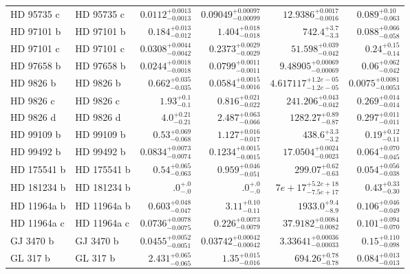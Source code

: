 \begin{longtable*}{llrrrr}
HD 95735 c & HD 95735 c & $0.0112^{+0.0013}_{-0.0013}$ & $0.09049^{+0.00097}_{-0.00099}$ & $12.9386^{+0.0017}_{-0.0016}$ & $0.089^{+0.10}_{-0.063}$ \\ 
HD 97101 b & HD 97101 b & $0.184^{+0.013}_{-0.012}$ & $1.404^{+0.018}_{-0.018}$ & $742.4^{+3.7}_{-3.3}$ & $0.088^{+0.066}_{-0.058}$ \\ 
HD 97101 c & HD 97101 c & $0.0308^{+0.0044}_{-0.0042}$ & $0.2373^{+0.0029}_{-0.0029}$ & $51.598^{+0.039}_{-0.042}$ & $0.24^{+0.15}_{-0.14}$ \\ 
HD 97658 b & HD 97658 b & $0.0244^{+0.0018}_{-0.0018}$ & $0.0799^{+0.0011}_{-0.0011}$ & $9.48905^{+0.00069}_{-0.00069}$ & $0.06^{+0.062}_{-0.042}$ \\ 
HD 9826 b & HD 9826 b & $0.662^{+0.035}_{-0.035}$ & $0.0584^{+0.0015}_{-0.0016}$ & $4.617117^{+1.2e-05}_{-1.2e-05}$ & $0.0075^{+0.0081}_{-0.0053}$ \\ 
HD 9826 c & HD 9826 c & $1.93^{+0.1}_{-0.1}$ & $0.816^{+0.021}_{-0.022}$ & $241.206^{+0.043}_{-0.042}$ & $0.269^{+0.014}_{-0.014}$ \\ 
HD 9826 d & HD 9826 d & $4.0^{+0.21}_{-0.21}$ & $2.487^{+0.063}_{-0.066}$ & $1282.27^{+0.89}_{-0.87}$ & $0.297^{+0.011}_{-0.011}$ \\ 
HD 99109 b & HD 99109 b & $0.53^{+0.069}_{-0.068}$ & $1.127^{+0.016}_{-0.017}$ & $438.6^{+3.3}_{-3.2}$ & $0.19^{+0.12}_{-0.11}$ \\ 
HD 99492 b & HD 99492 b & $0.0834^{+0.0073}_{-0.0074}$ & $0.1234^{+0.0015}_{-0.0015}$ & $17.0504^{+0.0024}_{-0.0023}$ & $0.064^{+0.070}_{-0.045}$ \\ 
HD 175541 b & HD 175541 b & $0.54^{+0.065}_{-0.063}$ & $0.959^{+0.046}_{-0.051}$ & $299.07^{+0.62}_{-0.63}$ & $0.054^{+0.056}_{-0.038}$ \\ 
HD 181234 b & HD 181234 b & $.0^{+.0}_{-.0}$ & $.0^{+.0}_{-.0}$ & $7e+17^{+5.2e+18}_{-7.5e+17}$ & $0.43^{+0.33}_{-0.30}$ \\ 
HD 11964a b & HD 11964a b & $0.603^{+0.048}_{-0.047}$ & $3.11^{+0.10}_{-0.11}$ & $1933.0^{+9.4}_{-8.9}$ & $0.106^{+0.046}_{-0.049}$ \\ 
HD 11964a c & HD 11964a c & $0.0736^{+0.0078}_{-0.0075}$ & $0.226^{+0.0073}_{-0.0079}$ & $37.9182^{+0.0084}_{-0.0082}$ & $0.101^{+0.094}_{-0.070}$ \\ 
GJ 3470 b & GJ 3470 b & $0.0455^{+0.0052}_{-0.0051}$ & $0.03742^{+0.00042}_{-0.00042}$ & $3.33641^{+0.00036}_{-0.00033}$ & $0.15^{+0.110}_{-0.098}$ \\ 
GL 317 b & GL 317 b & $2.431^{+0.065}_{-0.065}$ & $1.35^{+0.015}_{-0.016}$ & $694.26^{+0.78}_{-0.78}$ & $0.084^{+0.013}_{-0.013}$ \\ 

\end{longtable*}

